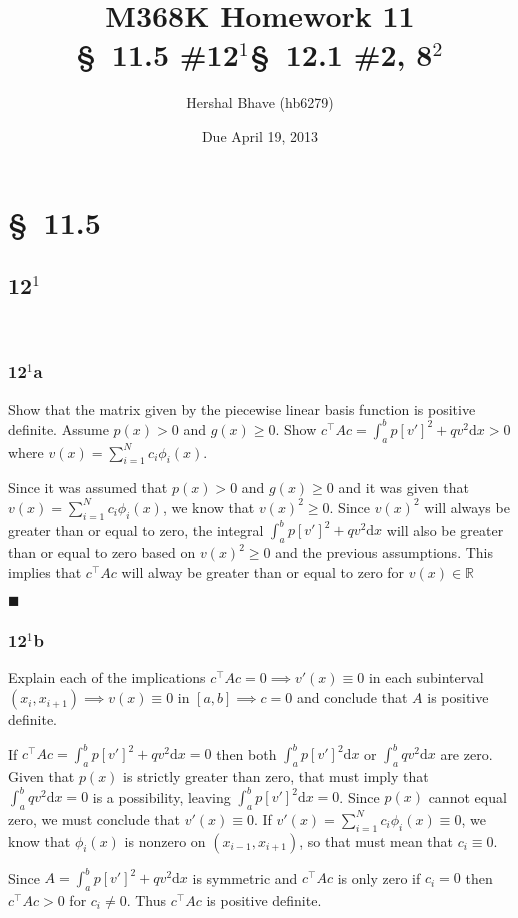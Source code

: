 \documentclass[12pt]{article}
\title{M368K Homework 11 \\
  \normalsize{\S~11.5 \#12$^1$\quad \S~12.1 \#2, 8$^2$}}
\author{Hershal Bhave (hb6279)}
\date{Due April 19, 2013}
\newcommand{\dd}[1]{\mathrm{d}{#1}}
\begin{document}
\maketitle

\section{\S~11.5}
\subsection{12$^1$}\
\subsubsection{12$^1$a}
Show that the matrix given by the piecewise linear basis function is
positive definite. Assume $p(x)>0$ and $g(x)\geq0$. Show $c^\intercal
Ac = \int_a^bp[v']^2+qv^2\dd{x} > 0$ where
$v(x)=\sum_{i=1}^Nc_i\phi_i(x)$.

\hfill

Since it was assumed that $p(x)>0$ and $g(x)\geq0$ and it was given
that $v(x)=\sum_{i=1}^Nc_i\phi_i(x)$, we know that
$v(x)^2\geq0$. Since $v(x)^2$ will always be greater than or equal to
zero, the integral $\int_a^bp[v']^2+qv^2\dd{x}$ will also be greater
than or equal to zero based on $v(x)^2\geq0$ and the previous
assumptions. This implies that $c^\intercal Ac$ will alway be greater
than or equal to zero for $v(x) \in \mathbb{R}$

\hfill $\blacksquare$

\subsubsection{12$^1$b}
Explain each of the implications $c^\intercal
Ac =0 \implies v'(x) \equiv 0$ in each subinterval $(x_i,x_{i+1})
\implies v(x) \equiv 0$ in $[a,b] \implies c=0$ and conclude that $A$
is positive definite.

\hfill

If $c^\intercal Ac = \int_a^bp[v']^2+qv^2\dd{x} = 0$ then both
$\int_a^bp[v']^2\dd{x}$ or $\int_a^bqv^2\dd{x}$ are zero. Given that
$p(x)$ is strictly greater than zero, that must imply that
$\int_a^bqv^2\dd{x}=0$ is a possibility, leaving
$\int_a^bp[v']^2\dd{x}=0$. Since $p(x)$ cannot equal zero, we must
conclude that $v'(x)\equiv0$. If
$v'(x)=\sum_{i=1}^Nc_i\phi_i(x)\equiv0$, we know that $\phi_i(x)$ is
nonzero on $(x_{i-1},x_{i+1})$, so that must mean that $c_i\equiv0$.

Since $A=\int_a^bp[v']^2+qv^2\dd{x}$ is symmetric and $c^\intercal Ac$
is only zero if $c_i=0$ then $c^\intercal Ac>0$ for $c_i\neq0$. Thus
$c^\intercal Ac$ is positive definite.
\end{document}
